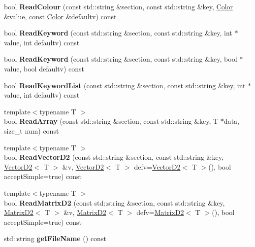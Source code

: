 \begin{DoxyCompactItemize}
\item 
\hypertarget{class_ini_reader_a9168412eb79af04b8b35887ecb7263f7}{
bool {\bfseries ReadColour} (const std::string \&section, const std::string \&key, \hyperlink{struct_color}{Color} \&value, const \hyperlink{struct_color}{Color} \&defaultv) const }
\label{class_ini_reader_a9168412eb79af04b8b35887ecb7263f7}

\item 
\hypertarget{class_ini_reader_a4f3e9abd3653813e4fa1999f4f2e8aeb}{
bool {\bfseries ReadKeyword} (const std::string \&section, const std::string \&key, int $\ast$value, int defaultv) const }
\label{class_ini_reader_a4f3e9abd3653813e4fa1999f4f2e8aeb}

\item 
\hypertarget{class_ini_reader_a681ce57bf33180f4833825c01dff61b2}{
bool {\bfseries ReadKeyword} (const std::string \&section, const std::string \&key, bool $\ast$value, bool defaultv) const }
\label{class_ini_reader_a681ce57bf33180f4833825c01dff61b2}

\item 
\hypertarget{class_ini_reader_aee2c2acc94cd8884068842fc216c12e2}{
bool {\bfseries ReadKeywordList} (const std::string \&section, const std::string \&key, int $\ast$value, int defaultv) const }
\label{class_ini_reader_aee2c2acc94cd8884068842fc216c12e2}

\item 
\hypertarget{class_ini_reader_ab73b336e62b169d7b6357943322e19ad}{
{\footnotesize template$<$typename T $>$ }\\bool {\bfseries ReadArray} (const std::string \&section, const std::string \&key, T $\ast$data, size\_\-t num) const }
\label{class_ini_reader_ab73b336e62b169d7b6357943322e19ad}

\item 
\hypertarget{class_ini_reader_a48929f4d114bffd6cbb5b8a14c8f18ee}{
{\footnotesize template$<$typename T $>$ }\\bool {\bfseries ReadVectorD2} (const std::string \&section, const std::string \&key, \hyperlink{struct_vector_d2}{VectorD2}$<$ T $>$ \&v, \hyperlink{struct_vector_d2}{VectorD2}$<$ T $>$ defv=\hyperlink{struct_vector_d2}{VectorD2}$<$ T $>$(), bool acceptSimple=true) const }
\label{class_ini_reader_a48929f4d114bffd6cbb5b8a14c8f18ee}

\item 
\hypertarget{class_ini_reader_a0e1049af706d4d905bb4c42b10d1ec14}{
{\footnotesize template$<$typename T $>$ }\\bool {\bfseries ReadMatrixD2} (const std::string \&section, const std::string \&key, \hyperlink{struct_matrix_d2}{MatrixD2}$<$ T $>$ \&v, \hyperlink{struct_matrix_d2}{MatrixD2}$<$ T $>$ defv=\hyperlink{struct_matrix_d2}{MatrixD2}$<$ T $>$(), bool acceptSimple=true) const }
\label{class_ini_reader_a0e1049af706d4d905bb4c42b10d1ec14}

\item 
\hypertarget{class_ini_reader_aa1f50a5608d6b0422692dd048d7e2b76}{
std::string {\bfseries getFileName} () const }
\label{class_ini_reader_aa1f50a5608d6b0422692dd048d7e2b76}

\end{DoxyCompactItemize}
